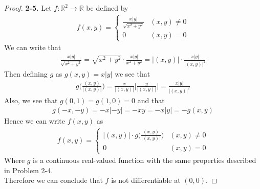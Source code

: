 \documentclass[11pt]{article}
\newcommand{\R}{\mathbb{R}}
\theoremstyle{definition}
\begin{document}
\cleardoublepage
\begin{proof}{\textbf{2-5.}}
Let $f:\R^2 \to \R$ be defined by
\begin{align*}
    f(x,y) = \begin{cases}
        \frac{x|y|}{\sqrt{x^2 + y^2}} & (x,y) \neq 0\\
        0 & (x,y) = 0
    \end{cases}
\end{align*}
We can write that
\begin{align*}
    \frac{x|y|}{\sqrt{x^2 + y^2}}
    = \sqrt{x^2 + y^2}\cdot \frac{x|y|}{x^2 + y^2}
    = |(x,y)| \cdot \frac{x|y|}{|(x,y)|^2}
\end{align*}
Then defining $g$ as $g(x,y) = x|y|$ we see that
\begin{align*}
    g\bigg(\frac{(x,y)}{|(x,y)|}\bigg)
    = \frac{x}{|(x,y)|}\bigg|\frac{y}{|(x,y)|}\bigg|
    = \frac{x|y|}{|(x,y)|^2}
\end{align*}
Also, we see that $g(0,1) = g(1,0) = 0$ and that
\begin{align*}
    g(-x,-y) = -x|-y| = -xy = -x|y| = -g(x,y)   
\end{align*}
Hence we can write $f(x,y)$ as
\begin{align*}
    f(x,y) = \begin{cases}
        |(x,y)|\cdot g\bigg(\frac{(x,y)}{|(x,y)|}\bigg) & (x,y) \neq 0\\
        0 & (x,y) = 0
    \end{cases}
\end{align*}
Where $g$ is a continuous real-valued function with the same properties
described in Problem 2-4.
\\
Therefore we can conclude that $f$ is not differentiable at $(0,0)$.
\end{proof}
\end{document}
